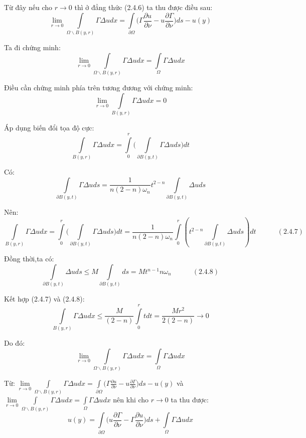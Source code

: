 Từ đây nếu cho $r \to 0$ thì ở đẳng thức (2.4.6) ta thu được điều sau:
\[
\mathop {\lim }\limits_{r \to 0} \int\limits_{\Omega \backslash B(y,r)} {\Gamma \Delta udx = \int\limits_{\partial \Omega } {(\Gamma \frac{{\partial u}}{{\partial \nu }}} }  - u\frac{{\partial \Gamma }}{{\partial \nu }})ds - u(y)
\]

Ta đi chứng minh: 
\[
\mathop {\lim }\limits_{r \to 0} \int\limits_{\Omega \backslash B(y,r)} {\Gamma \Delta udx = \int\limits_\Omega  {\Gamma \Delta udx} } 
\]

Điều cần chứng minh phía trên tương đương với chứng minh:
\[
\mathop {\lim }\limits_{r \to 0} \int\limits_{B(y,r)} {\Gamma \Delta udx}  = 0
\]

Áp dụng biến đổi tọa độ cực:
\[
\int\limits_{B(y,r)} {\Gamma \Delta udx}  = \int\limits_0^r {(\int\limits_{\partial B(y,t)} {\Gamma \Delta ud} } s)dt
\]

Có:
\[
\int\limits_{\partial B(y,t)} {\Gamma \Delta ud} s = \frac{1}{{n(2 - n)\omega _n }}t^{2 - n} \int\limits_{\partial B(y,t)} {\Delta uds} 
\]

Nên:
\[
\int\limits_{B(y,r)} {\Gamma \Delta udx}  = \int\limits_0^r {(\int\limits_{\partial B(y,t)} {\Gamma \Delta ud} } s)dt = \frac{1}{{n(2 - n)\omega _n }}\int\limits_0^r {(t^{2 - n} \int\limits_{\partial B(y,t)} {\Delta uds} )dt} 
\quad \quad \quad  (2.4.7)
\]

Đồng thời,ta có:
\[
\int\limits_{\partial B(y,t)} {\Delta uds}  \le M\int\limits_{\partial B(y,t)} {ds}  = Mt^{n - 1} n\omega _n 
\quad \quad \quad  (2.4.8)
\]

Kết hợp (2.4.7) và (2.4.8):
\[
\int\limits_{B(y,r)} {\Gamma \Delta udx}  \le \frac{M}{{(2 - n)}}\int\limits_0^r {tdt = \frac{{Mr^2 }}{{2(2 - n)}} \to 0} 
\]

Do đó:
\[
\mathop {\lim }\limits_{r \to 0} \int\limits_{\Omega \backslash B(y,r)} {\Gamma \Delta udx = \int\limits_\Omega  {\Gamma \Delta udx} } 
\]

Từ:$\;\mathop {\lim }\limits_{r \to 0} \int\limits_{\Omega \backslash B(y,r)} {\Gamma \Delta udx = \int\limits_{\partial \Omega } {(\Gamma \frac{{\partial u}}{{\partial \nu }}} }  - u\frac{{\partial \Gamma }}{{\partial \nu }})ds - u(y)$ và $\;$ $\mathop {\lim }\limits_{r \to 0} \int\limits_{\Omega \backslash B(y,r)} {\Gamma \Delta udx = \int\limits_\Omega  {\Gamma \Delta udx} } $ nên khi cho $r \to 0$ ta thu được:
\[
u(y) = \int\limits_{\partial \Omega } {(u\frac{{\partial \Gamma }}
{{\partial \nu }}}  - \Gamma \frac{{\partial u}}
{{\partial \nu }})ds + \int\limits_\Omega  {\Gamma \Delta udx}
\]

